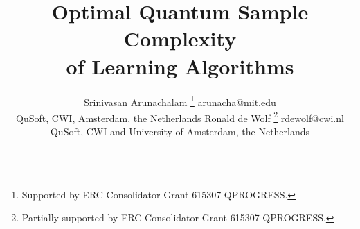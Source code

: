 \documentclass[twoside,11pt]{article}
\begin{document}
\title{Optimal Quantum Sample Complexity\\ of Learning Algorithms}

\author{\name Srinivasan Arunachalam \thanks{Supported by ERC Consolidator Grant
		615307 QPROGRESS.} \email arunacha@mit.edu\\
	\addr QuSoft, CWI, Amsterdam, the Netherlands
	\AND
	\name Ronald de Wolf \thanks{Partially supported by ERC Consolidator Grant
		615307 QPROGRESS.} \email rdewolf@cwi.nl \\
	\addr QuSoft, CWI and University of Amsterdam, the Netherlands
}


\maketitle
\end{document}
